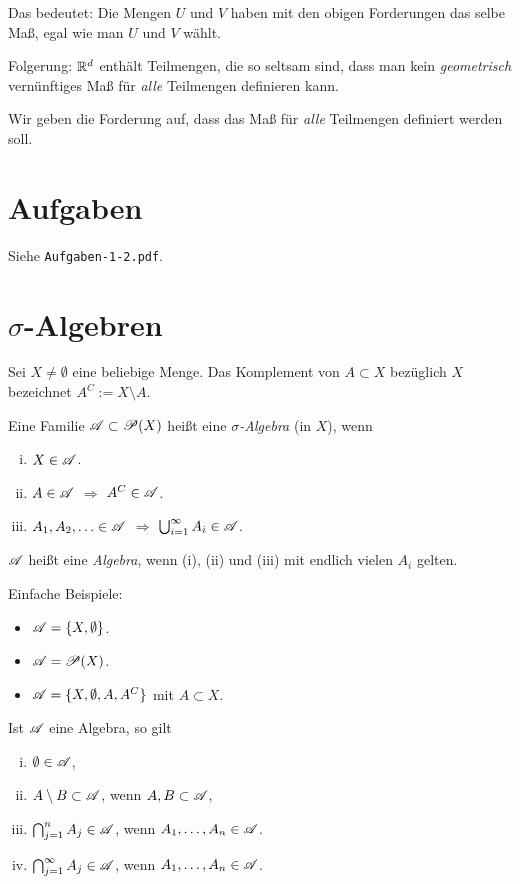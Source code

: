 Das bedeutet: Die Mengen $U$ und $V$ haben mit den obigen Forderungen das selbe
Maß, egal wie man $U$ und $V$ wählt. 

Folgerung: $\mathbb{R}^d$ enthält Teilmengen, die so seltsam sind, dass man kein
\emph{geometrisch} vernünf\-tiges Maß für \emph{alle} Teilmengen definieren
kann. 

Wir geben die Forderung auf, dass das Maß für \emph{alle} Teilmengen definiert
werden soll. 

\section{Aufgaben}
 Siehe \verb+Aufgaben-1-2.pdf+.

\section{\texorpdfstring{$\sigma$}{Sigma}-Algebren}
Sei $X \ne \emptyset$ eine beliebige Menge. Das Komplement von $A \subset X$
bezüglich $X$ bezeichnet $A^C := X \setminus A$.

\begin{defn}
 Eine Familie $\mathscr{A} \subset \mathscr{P}(X)$ heißt eine \emph{$\sigma$-Algebra} (in $X$),
 wenn
 \begin{enumerate}[(i)]
  \item $X \in \mathscr{A}$.
  \item $A \in \mathscr{A}$ $\Rightarrow$ $A^C \in \mathscr{A}$.
  \item $A_1, A_2, \ldots \in \mathscr{A}$ $\Rightarrow$ $\bigcup_{i=1}^\infty A_i \in \mathscr{A}$.
 \end{enumerate}
 $\mathscr{A}$ heißt eine \emph{Algebra}, wenn (i), (ii) und (iii) mit endlich vielen
 $A_i$ gelten.
\end{defn}

Einfache Beispiele:
\begin{itemize}
 \item $\mathscr{A} = \{ X, \emptyset \}$.
 \item $\mathscr{A} = \mathscr{P}( X )$.
 \item $\mathscr{A} = \{ X, \emptyset, A, A^C \}$ mit $A \subset X$.
\end{itemize}

\clearpage

\begin{lem}
 Ist $\mathscr{A}$ eine Algebra, so gilt
 \begin{enumerate}[(i)]
  \item $\emptyset \in \mathscr{A}$,
  \item $A \setminus B \subset \mathscr{A}$, wenn $A,B \subset \mathscr{A}$,
  \item $\bigcap_{j=1}^n A_j \in \mathscr{A}$, wenn $A_1, \ldots, A_n \in \mathscr{A}$.
  \item $\bigcap_{j=1}^\infty A_j \in \mathscr{A}$, wenn $A_1, \ldots, A_n \in \mathscr{A}$.
 \end{enumerate}
\end{lem}


